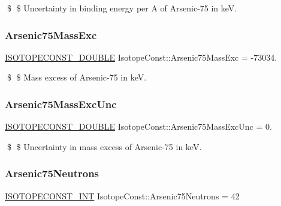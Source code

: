 \$ \$ Uncertainty in binding energy per A of Arsenic-\/75 in keV. \mbox{\label{group___isotope_const-_arsenic-_as75_ga3580daa86dcf62e509da3e45d176e9f3}} 
\subsubsection{\texorpdfstring{Arsenic75\+Mass\+Exc}{Arsenic75MassExc}}
{\footnotesize\ttfamily \mbox{\hyperlink{group___isotope_const-_macros_ga8f45a7272ce02c0b4c65c44636ed719a}{I\+S\+O\+T\+O\+P\+E\+C\+O\+N\+S\+T\+\_\+\+D\+O\+U\+B\+LE}} Isotope\+Const\+::\+Arsenic75\+Mass\+Exc = -\/73034.}

\$ \$ Mass excess of Arsenic-\/75 in keV. \mbox{\label{group___isotope_const-_arsenic-_as75_ga14c2cd2f89d723917f474b4c6834e754}} 
\subsubsection{\texorpdfstring{Arsenic75\+Mass\+Exc\+Unc}{Arsenic75MassExcUnc}}
{\footnotesize\ttfamily \mbox{\hyperlink{group___isotope_const-_macros_ga8f45a7272ce02c0b4c65c44636ed719a}{I\+S\+O\+T\+O\+P\+E\+C\+O\+N\+S\+T\+\_\+\+D\+O\+U\+B\+LE}} Isotope\+Const\+::\+Arsenic75\+Mass\+Exc\+Unc = 0.}

\$ \$ Uncertainty in mass excess of Arsenic-\/75 in keV. \mbox{\label{group___isotope_const-_arsenic-_as75_ga03d2c3c72598252302179810400bf138}} 
\subsubsection{\texorpdfstring{Arsenic75\+Neutrons}{Arsenic75Neutrons}}
{\footnotesize\ttfamily \mbox{\hyperlink{group___isotope_const-_macros_ga5f18360b3e99483a35c32d789e62621c}{I\+S\+O\+T\+O\+P\+E\+C\+O\+N\+S\+T\+\_\+\+I\+NT}} Isotope\+Const\+::\+Arsenic75\+Neutrons = 42}

